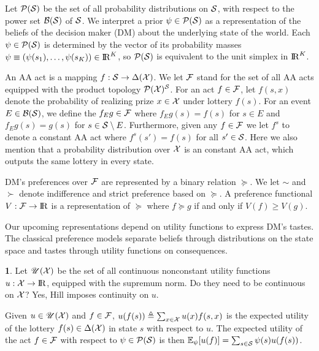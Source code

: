 \documentclass[11pt,oneside]{article}
\theoremstyle{plain}
\theoremstyle{plain}
\theoremstyle{plain}
\theoremstyle{plain}
\theoremstyle{plain}
\theoremstyle{definition}
\newtheorem{defn}[thm]{\protect\definitionname}
\theoremstyle{definition}
\theoremstyle{remark}
\theoremstyle{plain}
\providecommand{\definitionname}{Definition}
\newcommand{\R}{{\rm I\!R}}
\newcommand{\F}{{\cal F}}
\newcommand{\calps}{{\cal P}({\cal S})}
\newcommand{\mcs}{{\cal S}}
\newcommand{\mcx}{{\cal X}}
\newcommand{\wh}[1]{{\color{blue} #1     }}
\newcommand{\bb}[1]{{\color{red} #1     }}
\begin{document}
Let ${\cal P}(\mcs)$ be the set of all probability distributions on $\mcs$, with respect to the power set ${\cal B}(\mcs)$ of $\mcs$.
We interpret a prior $\psi \in {\cal P}(\mcs)$ as a representation of the beliefs of the decision maker (DM) about the underlying state of the world.
Each $\psi \in {\cal P}(\mcs)$ is determined by the vector of its probability masses $\psi \equiv (\psi(s_1),\ldots,\psi(s_K)) \in \R^K$, so $\calps$ is equivalent to the unit simplex in $\R^K$.

An AA act is a mapping $f:\mcs \to \Delta(\mcx)$. We let $\F$ stand for the set of all AA acts equipped with the product topology ${\cal P}(\mcx)^\mcs$. 
For an act $f \in \F$, let $f(s, x)$ denote the probability of realizing prize $x \in {\cal X}$ under lottery $f(s)$. For an event $E \in {\cal B}(\mcs)$, we define the $f_E g \in {\cal F}$ where $f_E g(s) = f(s)$ for $s \in E$ and $f_E g(s) = g(s)$ for $s \in \mcs \setminus E$. 
Furthermore, given any $f \in \F$ we let $f^s$ to denote a constant AA act where $f^s(s') = f(s)$ for all $s' \in \mcs$. Here we also mention that
a probability distribution over $\mcx$ is an constant AA act, which outputs the same lottery in every state. 

DM's preferences over ${\cal F}$ are represented by a binary relation $\succeq$. We let $\sim$ and $\succ$ denote indifference and strict preference based on $\succeq$.
A preference functional $V : {\cal F} \rightarrow \R$ is a representation of $\succeq$ where $f \succeq g$ if and only if $V(f) \geq V(g)$.

Our upcoming representations depend on utility functions to express DM's tastes.
The classical preference models separate beliefs through distributions on the state space and tastes through utility functions on consequences.
%
\begin{defn}
\label{eq:utility_function}
Let $\mathscr{U}({\cal X})$ be the set of all continuous nonconstant utility functions $u : {\cal X} \rightarrow \R$, equipped with the supremum norm. \wh{Do they need to be continuous on ${\cal X}$?} \bb{Yes, Hill imposes continuity on $u$.}
\end{defn}
%
\noindent
Given $u \in \mathscr{U}({\cal X})$ and $f \in \F$, $u(f(s)) \triangleq \sum_{x \in {\cal X}} u(x) f(s, x)$ is the expected utility of the lottery $f(s) \in \Delta(\mcx)$ in state $s$ with respect to $u$.
The expected utility of the act $f \in {\cal F}$ with respect to $\psi \in \calps$ is then $\mathbb{E}_{\psi}[u(f)] = \sum_{s \in \mcs} \psi(s) u(f(s))$.
\end{document}
